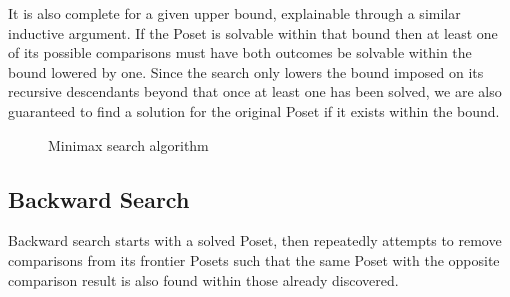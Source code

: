 \documentclass[10pt,journal,compsoc]{IEEEtran}
\begin{document}
It is also complete for a given upper bound, explainable through a similar inductive argument. If
the Poset is solvable within that bound then at least one of its possible comparisons must have both
outcomes be solvable within the bound lowered by one. Since the search only lowers the bound imposed
on its recursive descendants beyond that once at least one has been solved, we are also guaranteed
to find a solution for the original Poset if it exists within the bound.

\begin{figure}
  \caption{Minimax search algorithm} \label{fig:minimax_search}
\end{figure}

\subsection{Backward Search}

Backward search starts with a solved Poset, then repeatedly attempts to remove comparisons from its
frontier Posets such that the same Poset with the opposite comparison result is also found within
those already discovered.
\end{document}
